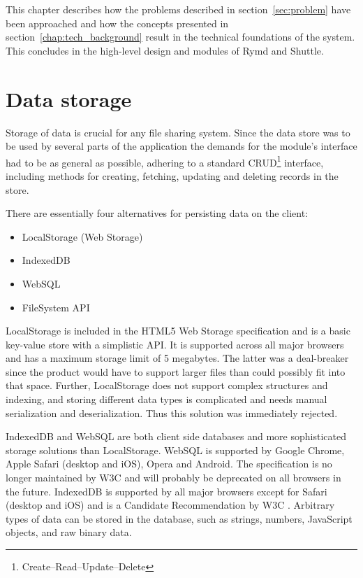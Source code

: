 This chapter describes how the problems described in section~\ref{sec:problem} have been approached and how the concepts presented in section~\ref{chap:tech_background} result in the technical foundations of the system. This concludes in the high-level design and modules of Rymd and Shuttle.



\section{Data storage}
\label{sec:datastorage}
Storage of data is crucial for any file sharing system. Since the data store was to be used by several parts of the application the demands for the module's interface had to be as general as possible, adhering to a standard CRUD\footnote{Create–Read–Update–Delete} interface, including methods for creating, fetching, updating and deleting records in the store.

There are essentially four alternatives for persisting data on the client:

\begin{itemize}
\item LocalStorage (Web Storage)
\item IndexedDB
\item WebSQL
\item FileSystem API
\end{itemize}

LocalStorage is included in the HTML5 Web Storage specification \cite{WebStorage:Online} and is a basic key-value store with a simplistic API. It is supported across all major browsers and has a maximum storage limit of 5 megabytes. The latter was a deal-breaker since the product would have to support larger files than could possibly fit into that space. Further, LocalStorage does not support complex structures and indexing, and storing different data types is complicated and needs manual serialization and deserialization. Thus this solution was immediately rejected.

IndexedDB and WebSQL are both client side databases and more sophisticated storage solutions than LocalStorage. WebSQL is supported by Google Chrome, Apple Safari (desktop and iOS), Opera and Android. The specification is no longer maintained by W3C \cite{WebSQL:Online} and will probably be deprecated on all browsers in the future. IndexedDB is supported by all major browsers except for Safari (desktop and iOS) and is a Candidate Recommendation by W3C \cite{IndexedDB:Online}. Arbitrary types of data can be stored in the database, such as strings, numbers, JavaScript objects, and raw binary data.

